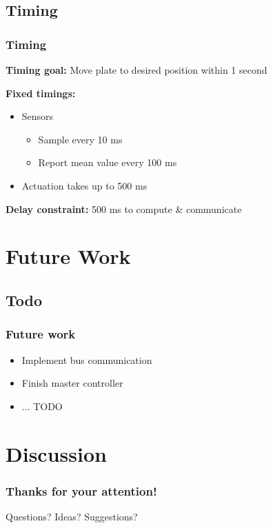 \documentclass{beamer}
\begin{document}
\subsection{Timing}
\begin{frame}
	\frametitle{Timing}
	\textbf{Timing goal:} Move plate to desired position within 1 second
	
	\vfill
	
	\textbf{Fixed timings:}
	\begin{itemize}
		\item Sensors
			\begin{itemize}
				\item Sample every 10 ms
				\item Report mean value every 100 ms
			\end{itemize}
		\item Actuation takes up to 500 ms
	\end{itemize}
	
	\vfill
	
	\textbf{Delay constraint:} 500 ms to compute \& communicate
\end{frame}


\section{Future Work}
\subsection{Todo}
\begin{frame}
  \frametitle{Future work}
  	\begin{itemize}
		\item Implement bus communication
		\item Finish master controller
		\item ... TODO
	\end{itemize}
\end{frame}

\section{Discussion}
\begin{frame}
	\frametitle{Thanks for your attention!}
	\huge{Questions? Ideas? Suggestions?}
\end{frame}
\end{document}
